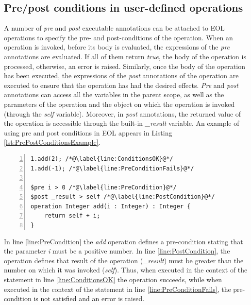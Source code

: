 \subsection{Pre/post conditions in user-defined operations}

A number of \emph{pre} and \emph{post} executable annotations can be attached to EOL operations to specify the pre- and post-conditions of the operation. When an operation is invoked, before its body is evaluated, the expressions of the \emph{pre} annotations are evaluated. If all of them return \emph{true}, the body of the operation is processed, otherwise, an error is raised. Similarly, once the body of the operation has been executed, the expressions of the \emph{post} annotations of the operation are executed to ensure that the operation has had the desired effects. \emph{Pre} and \emph{post} annotations can access all the variables in the parent scope, as well as the parameters of the operation and the object on which the operation is invoked (through the \emph{self} variable). Moreover, in \emph{post} annotations, the returned value of the operation is accessible through the built-in \emph{\_result} variable. An example of using pre and post conditions in EOL appears in Listing \ref{lst:PrePostConditionsExample}.

\begin{lstlisting}[basicstyle=\ttfamily\footnotesize, flexiblecolumns=true, numbers=left, nolol=true, caption=Example of pre- and post-conditions in an EOL operation, label=lst:PrePostConditionsExample, language=EOL, tabsize=2]
1.add(2); /*@\label{line:ConditionsOK}@*/
1.add(-1); /*@\label{line:PreConditionFails}@*/

$pre i > 0 /*@\label{line:PreCondition}@*/
$post _result > self /*@\label{line:PostCondition}@*/
operation Integer add(i : Integer) : Integer {
	return self + i;
}
\end{lstlisting}

In line \ref{line:PreCondition} the \emph{add} operation defines a pre-condition stating that the parameter \emph{i} must be a positive number. In line \ref{line:PostCondition}, the operation defines that result of the operation (\emph{\_result}) must be greater than the number on which it was invoked (\emph{self}). Thus, when executed in the context of the statement in line \ref{line:ConditionsOK} the operation succeeds, while when executed in the context of the statement in line \ref{line:PreConditionFails}, the pre-condition is not satisfied and an error is raised. 

